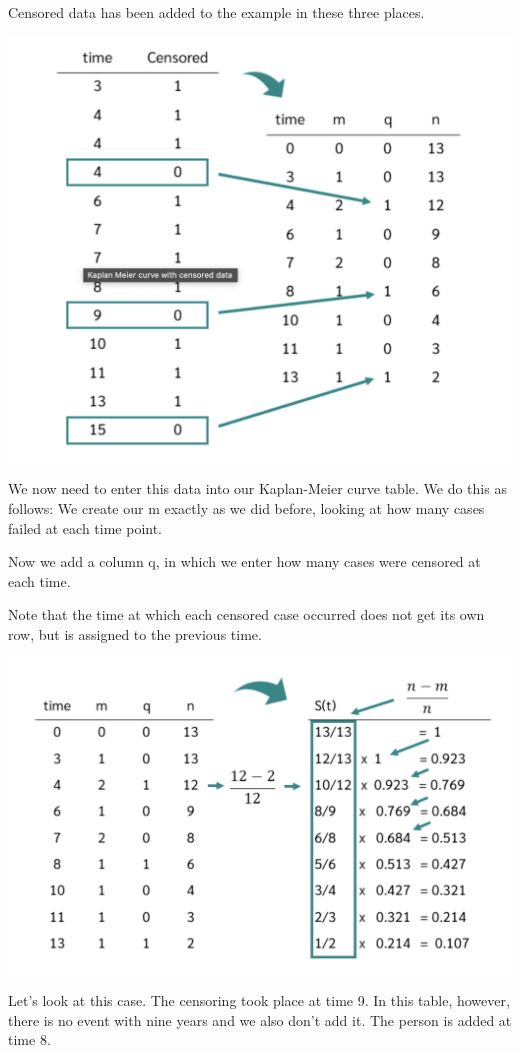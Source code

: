 \documentclass[
]{book}
\begin{document}
Censored data has been added to the example in these three places.

\includegraphics{figs/km2.png}

We now need to enter this data into our Kaplan-Meier curve table. We do this as follows: We create our m exactly as we did before, looking at how many cases failed at each time point.

Now we add a column q, in which we enter how many cases were censored at each time.

Note that the time at which each censored case occurred does not get its own row, but is assigned to the previous time.

\includegraphics{figs/km3.png}

Let's look at this case. The censoring took place at time 9. In this table, however, there is no event with nine years and we also don't add it. The person is added at time 8.
\end{document}
